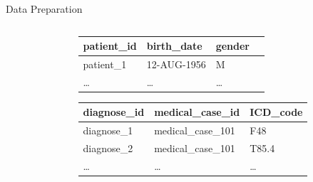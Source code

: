 \documentclass{beamer}
\begin{document}
\begin{frame}{Data Preparation}
\begin{columns}
\begin{column}{.3\textwidth}
\end{column}%
\hfill%
\begin{column}{.66\textwidth}
  \centering

  \begin{tabular}{| l | l | l | l |}
    \hline
    patient\_id & birth\_date  & gender \\ \hline
    patient\_1  & 12-AUG-1956 & M \\
    \ldots  & \ldots & \ldots \\
    \hline
  \end{tabular}
  
  \begin{tabular}{| l | l | l |}
    \hline
    diagnose\_id & medical\_case\_id  & ICD\_code \\ \hline
    diagnose\_1  & medical\_case\_101 & F48      \\
    diagnose\_2  & medical\_case\_101 & T85.4    \\
    \ldots  & \ldots & \ldots   \\
    \hline
  \end{tabular}

\end{column}%
\end{columns}
\end{frame}
\end{document}
